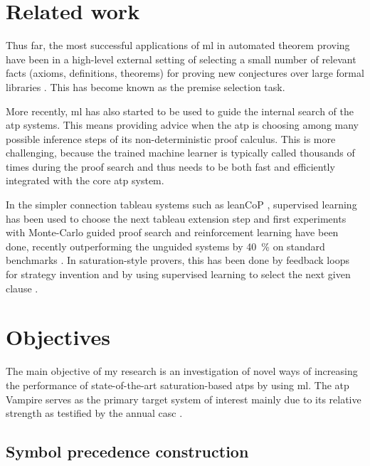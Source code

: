 \documentclass{article}
\begin{document}
\section{Related work}

Thus far, the most successful applications of \gls{ml} in automated theorem proving have been in a high-level external setting of selecting a small number of relevant facts (axioms, definitions, theorems) for proving new conjectures over large formal libraries \cite{DBLP:journals/jar/AlamaHKTU14,DBLP:journals/jar/BlanchetteGKKU16,DBLP:conf/cpp/GauthierK15}.
This has become known as the premise selection task.

More recently, \gls{ml} has also started to be used to guide the internal search of the \gls{atp} systems.
This means providing advice when the \gls{atp} is choosing among many possible inference steps of its non-deterministic proof calculus.
This is more challenging, because the trained machine learner is typically called thousands of times during the proof search and thus needs to be both fast and efficiently integrated with the core \gls{atp} system.

In the simpler connection tableau systems such as leanCoP \cite{10.1007/978-3-540-71070-7_23}, supervised learning has been used to choose the next tableau extension step \cite{DBLP:journals/jar/FarberKU21} and first experiments with Monte-Carlo guided proof search and reinforcement learning have been done, recently outperforming the unguided systems by \SI{40}{\percent} on standard benchmarks \cite{DBLP:conf/nips/KaliszykUMO18}.
In saturation-style provers, this has been done by feedback loops for strategy invention \cite{DBLP:journals/aicom/JakubuvU18,DBLP:conf/gcai/SchaferS15} and by using supervised learning \cite{DBLP:conf/cade/JakubuvCOP0U20,DBLP:conf/lpar/LoosISK17} to select the next given clause \cite{McCune2003}.

\section{Objectives}

The main objective of my research is an investigation of novel ways of increasing the performance of state-of-the-art saturation-based \glspl{atp} by using \gls{ml}.
The \gls{atp} Vampire \cite{DBLP:conf/cav/KovacsV13} serves as the primary target system of interest
mainly due to its relative strength
as testified by the annual \gls{casc} \cite{Sut16}.

\subsection{Symbol precedence construction}
\end{document}
